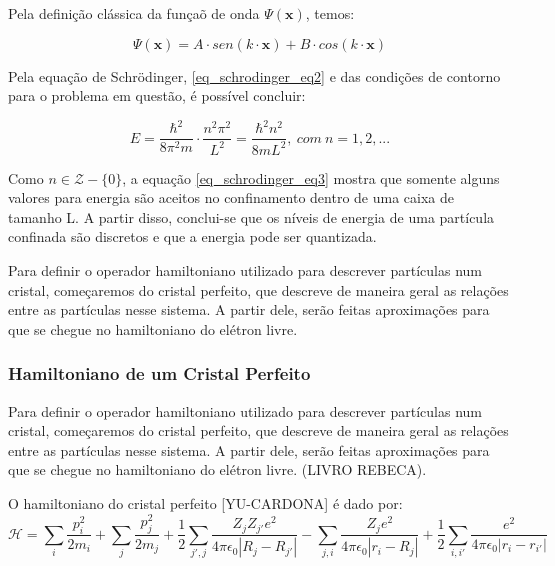 \documentclass[11pt]{article}
\numberwithin{equation}{section}
\begin{document}
    \par Pela definição clássica da funçaõ de onda $\Psi(\mathbf{x})$, temos:

    \begin{equation}\label{eq_schrodinger_eq2}
        \Psi (\mathbf{x}) = A \cdot sen(k \cdot \mathbf{x}) + B \cdot cos(k \cdot \mathbf{x})
    \end{equation}

    \par Pela equação de Schrödinger, \eqref{eq_schrodinger_eq2} e das condições de contorno para o problema em questão, é possível concluir:

    \begin{equation}\label{eq_schrodinger_eq3}
      E = \frac{\hbar^2}{8 \pi^2 m} \cdot \frac{n^2\pi^2}{L^2} = \frac{\hbar^2 n^2}{8 m L^2},\ com\ n = 1, 2, ...
    \end{equation}

    \par Como $n \in \mathcal{Z} - \{0\}$, a equação \eqref{eq_schrodinger_eq3} mostra que somente alguns valores para energia são aceitos no confinamento dentro de uma caixa de tamanho L. A partir disso, conclui-se que os níveis de energia de uma partícula confinada são discretos e que a energia pode ser quantizada.

    \par Para definir o operador hamiltoniano utilizado para descrever partículas num cristal, começaremos do cristal perfeito, que descreve de maneira geral as relações entre as partículas nesse sistema. A partir dele, serão feitas aproximações para que se chegue no hamiltoniano do elétron livre.

    \subsubsection{Hamiltoniano de um Cristal Perfeito}

      \par Para definir o operador hamiltoniano utilizado para descrever partículas num cristal, começaremos do cristal perfeito, que descreve de maneira geral as relações entre as partículas nesse sistema. A partir dele, serão feitas aproximações para que se chegue no hamiltoniano do elétron livre. (LIVRO REBECA). 
    
      \par O hamiltoniano do cristal perfeito [YU-CARDONA] é dado por:
      \begin{equation}\label{eq_schrodinger_eq4}
        \mathcal{H} = 
          \sum_{i} \frac{p_{i}^2}{2m_{i}} 
          + \sum_{j} \frac{p_{j}^2}{2m_{j}} 
          + \frac{1}{2} \sum_{j', j} \frac{Z_{j} Z_{j'} e^2}{4\pi\epsilon_{0}\left|R_{j} - R_{j'}\right|}-  \sum_{j, i} \frac{Z_{j} e^2}{4\pi\epsilon_{0}\left|r_{i} - R_{j}\right|} 
          + \frac{1}{2} \sum_{i, i'} \frac{e^2}{4\pi\epsilon_{0}\left|r_{i} - r_{i'}\right|}
      \end{equation}
\end{document}
